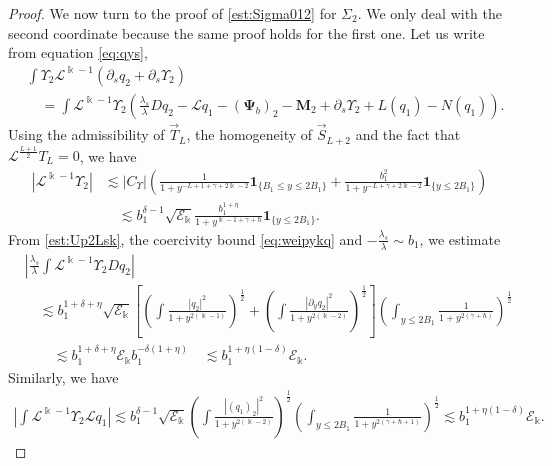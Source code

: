 \documentclass[11pt]{aims}
\theoremstyle{definition}
\numberwithin{equation}{section}
\begin{document}
\begin{proof}
We now turn to the proof of \eqref{est:Sigma012} for $\Sigma_2$. We only deal with the second coordinate because the same proof holds for the first one. Let us write from equation \eqref{eq:qys}, 
\begin{align*}
&\int \Upsilon_2 {\mathscr{L}}^{\Bbbk - 1} \left({\partial_s} q_2 + {\partial_s} \Upsilon_2\right)\\
&\quad  = \int {\mathscr{L}}^{\Bbbk - 1}\Upsilon_2 \left( \frac{\lambda_s}{\lambda}Dq_2 - {\mathscr{L}} q_1 - (\mathbf{\Psi}_b)_2  - \mathbf{M}_2 + {\partial_s} \Upsilon_2 + L(q_1) - N(q_1)\right).
\end{align*}
Using the admissibility of $\vec T_L$, the homogeneity of $\vec S_{L+2}$ and the fact that ${\mathscr{L}}^{\frac{L + 1}{2}}T_L = 0$, we have 
\begin{align}
\left|{\mathscr{L}}^{\Bbbk - 1}\Upsilon_2\right| &\lesssim |C_\Upsilon|\left( \frac{1}{1 + y^{- L + 1 + \gamma + 2\Bbbk - 2}}\mathbf{1}_{\{B_1 \leq y \leq 2B_1\}} + \frac{b_1^2}{1 + y^{- L + \gamma + 2\Bbbk - 2}}\mathbf{1}_{\{y \leq 2B_1\}} \right)\nonumber\\
&\quad \lesssim b_1^{\delta - 1} \sqrt{{\mathscr{E}}_\Bbbk} \frac{b_1^{1 + \eta}}{1 + y^{\Bbbk - 1 + \gamma + \hbar}}\mathbf{1}_{\{y \leq 2B_1\}}. \label{est:Up2Lsk}
\end{align}
From \eqref{est:Up2Lsk}, the coercivity bound \eqref{eq:weipykq} and  $-\frac{\lambda_s}{\lambda} \sim b_1$, we estimate 
\begin{align*}
&\left| \frac{\lambda_s}{\lambda}\int {\mathscr{L}}^{\Bbbk - 1}\Upsilon_2 Dq_2\right|\\
 & \quad \lesssim b_1^{1 + \delta + \eta}\sqrt{{\mathscr{E}}_\Bbbk} \left[\left(\int \frac{|q_2|^2}{1 + y^{2(\Bbbk - 1)}} \right)^\frac{1}{2} + \left(\int \frac{|{\partial_y} q_2|^2}{1 + y^{2(\Bbbk - 2)}} \right)^\frac{1}{2} \right]\left(\int_{y \leq 2B_1} \frac{1}{1 + y^{2(\gamma + \hbar)}}\right)^\frac{1}{2}\\
& \qquad \lesssim b_1^{1 + \delta + \eta}{\mathscr{E}}_\Bbbk b_1^{-\delta(1  +\eta)} \quad \lesssim b_1^{1 + \eta
(1 - \delta)}{\mathscr{E}}_\Bbbk.
\end{align*}
Similarly, we have 
\begin{align*}
\left|\int {\mathscr{L}}^{\Bbbk - 1}\Upsilon_2 {\mathscr{L}} q_1\right| \lesssim b_1^{\delta - 1}\sqrt{{\mathscr{E}}_\Bbbk} \left( \int \frac{|(q_1)_2|^2}{1 + y^{2(\Bbbk - 2)}}\right)^\frac{1}{2}\left(\int_{y \leq 2B_1} \frac{1}{1 + y^{2(\gamma + \hbar + 1)}}\right)^\frac{1}{2} \lesssim b_1^{1 + \eta(1 - \delta)} {\mathscr{E}}_\Bbbk.

\end{align*}
\end{proof}
\end{document}
